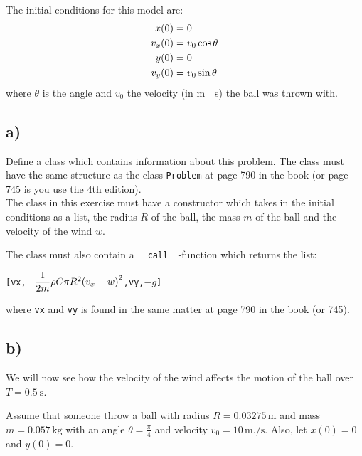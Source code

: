 \documentclass[10pt,a4paper]{article}
\begin{document}
The initial conditions for this model are:
\begin{align*} 
x(0) &= 0 \\
v_x(0) &= v_0\cos\theta
\hfill \\
y(0) &= 0 \\
v_y(0) &= v_0\sin\theta
\end{align*}
where $\theta$ is the angle and $v_0$ the velocity (in \si{\meter.\per\second}) the ball was thrown with. 

\subsection*{a)}
Define a class which contains information about this problem. The class must have the same structure as the class \texttt{Problem} at page 790 in the book (or page 745 is you use the 4th edition). \\
The class in this exercise must have a constructor which takes in the initial conditions as a list, the radius $R$ of the ball, the mass $m$ of the ball and the velocity of the wind $w$. 

The class must also contain a \texttt{\_\_call\_\_}-function which returns the list: 
\begin{center}
\texttt{[vx,$ -\dfrac{1}{2m}\rho C \pi R^2 \qty(v_x - w)^2$,vy,$-g$]}  
\end{center}
where \texttt{vx} and \texttt{vy} is found in the same matter at page 790 in the book (or 745). 
\subsection*{b)} 
We will now see how the velocity of the wind affects the motion of the ball over $T = \SI{0.5}{\second}$. 

Assume that someone throw a ball with radius $R = 0.03275\,\si{\meter}$ and mass $m = 0.057\,\si{\kg}$ with an angle $\theta = \frac{\pi}{4}$ and velocity $ v_0 = 10 \,\si{\meter.\per\second}$. Also, let  $x(0) = 0$ and $y(0) = 0$.
\end{document}
